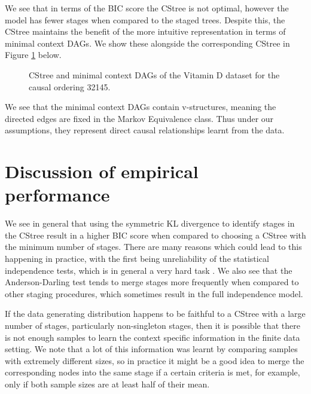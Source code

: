 \documentclass{tufte-book}
\begin{document}
We see that in terms of the BIC score the CStree is not optimal, however the model has fewer stages when compared to the staged trees. Despite this, the CStree maintains the benefit of the more intuitive representation in terms of minimal context DAGs. We show these alongside the corresponding CStree in Figure \ref{fig:vitd_mcdags} below.

\begin{figure}[!h]\label{fig:vitd_mcdags}
   \begin{floatrow}
%
\caption{ CStree and minimal context DAGs of the Vitamin D dataset for the causal ordering 32145. }
        
   \end{floatrow}
\end{figure}


We see that the minimal context DAGs contain v-structures, meaning the directed edges are fixed in the Markov Equivalence class. Thus under our assumptions, they represent direct causal relationships learnt from the data.


\section{Discussion of empirical performance}
\label{sec:orgac94447}

We see in general that using the symmetric KL divergence to identify stages in the CStree result in a higher BIC score when compared to choosing a CStree with the minimum number of stages. There are many reasons which could lead to this happening in practice, with the first being unreliability of the statistical independence tests, which is in general a very hard task \cite{shah-2020-hardn-condit}.  We also see that the Anderson-Darling test tends to merge stages more frequently when compared to other staging procedures, which sometimes result in the full independence model. 


If the data generating distribution happens to be faithful to a CStree with a large number of stages, particularly non-singleton stages, then it is possible that there is not enough samples to learn the context specific information in the finite data setting. We note that a lot of this information was learnt by comparing samples with extremely different sizes, so in practice it might be a good idea to merge the corresponding nodes into the same stage if a certain criteria is met, for example, only if both sample sizes are at least half of their mean.
\end{document}
